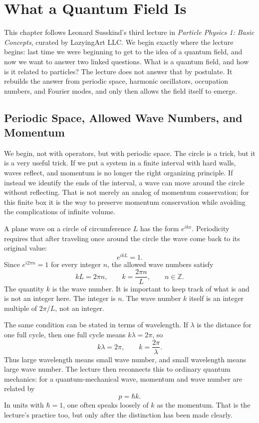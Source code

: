 \chapter{What a Quantum Field Is}

This chapter follows Leonard Susskind's third lecture in \emph{Particle Physics 1: Basic Concepts}, curated by LazyingArt LLC. We begin exactly where the lecture begins: last time we were beginning to get to the idea of a quantum field, and now we want to answer two linked questions. What is a quantum field, and how is it related to particles? The lecture does not answer that by postulate. It rebuilds the answer from periodic space, harmonic oscillators, occupation numbers, and Fourier modes, and only then allows the field itself to emerge.

\section{Periodic Space, Allowed Wave Numbers, and Momentum}

We begin, not with operators, but with periodic space. The circle is a trick, but it is a very useful trick. If we put a system in a finite interval with hard walls, waves reflect, and momentum is no longer the right organizing principle. If instead we identify the ends of the interval, a wave can move around the circle without reflecting. That is not merely an analog of momentum conservation; for this finite box it is the way to preserve momentum conservation while avoiding the complications of infinite volume.

A plane wave on a circle of circumference \(L\) has the form \(e^{ikx}\). Periodicity requires that after traveling once around the circle the wave come back to its original value:
\begin{equation}
e^{ikL}=1.
\end{equation}
Since \(e^{i2\pi n}=1\) for every integer \(n\), the allowed wave numbers satisfy
\begin{equation}
kL=2\pi n,
\qquad
k=\frac{2\pi n}{L},
\qquad
n\in\mathbb{Z}.
\end{equation}
The quantity \(k\) is the wave number. It is important to keep track of what is and is not an integer here. The integer is \(n\). The wave number \(k\) itself is an integer multiple of \(2\pi/L\), not an integer.

The same condition can be stated in terms of wavelength. If \(\lambda\) is the distance for one full cycle, then one full cycle means \(k\lambda=2\pi\), so
\begin{equation}
k\lambda=2\pi,
\qquad
k=\frac{2\pi}{\lambda}.
\end{equation}
Thus large wavelength means small wave number, and small wavelength means large wave number. The lecture then reconnects this to ordinary quantum mechanics: for a quantum-mechanical wave, momentum and wave number are related by
\begin{equation}
p=\hbar k.
\end{equation}
In units with \(\hbar=1\), one often speaks loosely of \(k\) as the momentum. That is the lecture's practice too, but only after the distinction has been made clearly.

